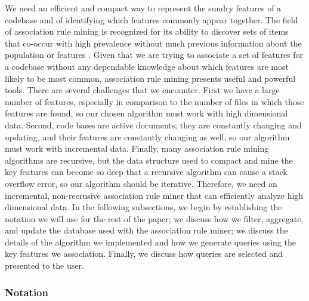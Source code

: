 \documentclass[12pt]{article}
\begin{document}
We need an efficient and compact way to represent the sundry features of a codebase and of identifying which features commonly appear together. The field of association rule mining is recognized for its ability to discover sets of items that co-occur with high prevalence without much previous information about the population or features \cite{AiEtAl2018}. Given that we are trying to associate a set of features for a codebase without any dependable knowledge about which features are most likely to be most common, association rule mining presents useful and powerful tools. There are several challenges that we encounter. First we have a large number of features, especially in comparison to the number of files in which those features are found, so our chosen algorithm must work with high dimensional data. Second, code bases are active documents; they are constantly changing and updating, and their features are constantly changing as well, so our algorithm must work with incremental data. Finally, many association rule mining algorithms are recursive, but the data structure used to compact and mine the key features can become so deep that a recursive algorithm can cause a stack overflow error, so our algorithm should be iterative. Therefore, we need an incremental, non-recrusive association rule miner that can efficiently analyze high dimensional data. In the following subsections, we begin by establishing the notation we will use for the rest of the paper; we discuss how we filter, aggregate, and update the database used with the association rule miner; we discuss the details of the algorithm we implemented and how we generate queries using the key features we association. Finally, we discuss how queries are selected and presented to the user.

\subsubsection{Notation}
\end{document}

